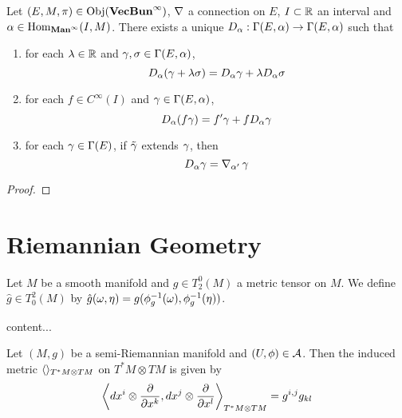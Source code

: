 \documentclass{book}
\begin{document}
	\begin{ex}
		Let $(E, M, \pi) \in \operatorname{Obj}(\operatorname*{\text{\textbf{VecBun}}^{\infty}})$, $\operatorname{\nabla}$ a connection on $E$, $I \subset \mathbb{R}$ an interval and $\alpha \in \operatorname{Hom}_{\operatorname*{\text{\textbf{Man}}^{\infty}}}(I, M)$. There exists a unique $D_{\alpha}: \Gamma(E, \alpha) \rightarrow \Gamma(E, \alpha)$ such that 
		\begin{enumerate}
			\item for each $\lambda \in \mathbb{R}$ and $\gamma, \sigma \in \Gamma(E, \alpha)$, 
			$$D_{\alpha}(\gamma + \lambda \sigma) = D_{\alpha} \gamma + \lambda D_{\alpha} \sigma $$
			\item for each $f \in C^{\infty}(I)$ and $\gamma \in \Gamma(E, \alpha)$, 
			$$D_{\alpha}(f \gamma) = f' \gamma + f D_{\alpha} \gamma $$
			\item for each $\gamma \in \Gamma(E)$, if $\tilde{\gamma}$ extends $\gamma$, then 
			$$D_{\alpha} \gamma = \operatorname{\nabla}_{\alpha'} \gamma$$
		\end{enumerate}
	\end{ex}

	\begin{proof}
		
	\end{proof}
	























	\newpage
	\chapter{Riemannian Geometry}

	\begin{defn}
		Let $M$ be a smooth manifold and $g \in T^0_2(M)$ a metric tensor on $M$. We define $\hat{g} \in T^2_0(M)$ by $\hat{g}(\omega, \eta) = g(\phi_g^{-1}(\omega), \phi_g^{-1}(\eta))$. 
	\end{defn}

	\begin{ex}
		content...
	\end{ex}

	\begin{ex}
		Let $(M, g)$ be a semi-Riemannian manifold and $(U, \phi) \in \mathcal{A}$. Then the induced metric $\langle \rangle_{T^*M \otimes TM}$ on $T^*M \otimes TM$ is given by 
		$$\bigg \langle dx^i \otimes \frac{\partial }{\partial x^k}, dx^j \otimes \frac{\partial}{\partial x^l} \bigg \rangle_{T^*M \otimes TM} = g^{i,j}g_{kl}$$
	\end{ex}
\end{document}

